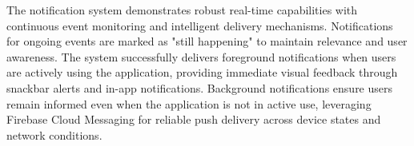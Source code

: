 The notification system demonstrates robust real-time capabilities with continuous event monitoring and intelligent delivery mechanisms. Notifications for ongoing events are marked as "still happening" to maintain relevance and user awareness. The system successfully delivers foreground notifications when users are actively using the application, providing immediate visual feedback through snackbar alerts and in-app notifications. Background notifications ensure users remain informed even when the application is not in active use, leveraging Firebase Cloud Messaging for reliable push delivery across device states and network conditions.

\clearpage

\begin{figure}[!htbp]
    \centering
\end{figure}
